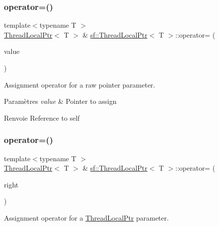 \subsubsection{\texorpdfstring{operator=()}{operator=()}\hspace{0.1cm}{\footnotesize\ttfamily [1/2]}}
{\footnotesize\ttfamily template$<$typename T $>$ \\
\hyperlink{classsf_1_1ThreadLocalPtr}{Thread\+Local\+Ptr}$<$ T $>$ \& \hyperlink{classsf_1_1ThreadLocalPtr}{sf\+::\+Thread\+Local\+Ptr}$<$ T $>$\+::operator= (\begin{DoxyParamCaption}\item[{T $\ast$}]{value }\end{DoxyParamCaption})}



Assignment operator for a raw pointer parameter. 


\begin{DoxyParams}{Paramètres}
{\em value} & Pointer to assign\\
\hline
\end{DoxyParams}
\begin{DoxyReturn}{Renvoie}
Reference to self 
\end{DoxyReturn}
\mbox{\label{classsf_1_1ThreadLocalPtr_a6792a6a808af06f0d13e3ceecf2fc947}} 
\subsubsection{\texorpdfstring{operator=()}{operator=()}\hspace{0.1cm}{\footnotesize\ttfamily [2/2]}}
{\footnotesize\ttfamily template$<$typename T $>$ \\
\hyperlink{classsf_1_1ThreadLocalPtr}{Thread\+Local\+Ptr}$<$ T $>$ \& \hyperlink{classsf_1_1ThreadLocalPtr}{sf\+::\+Thread\+Local\+Ptr}$<$ T $>$\+::operator= (\begin{DoxyParamCaption}\item[{const \hyperlink{classsf_1_1ThreadLocalPtr}{Thread\+Local\+Ptr}$<$ T $>$ \&}]{right }\end{DoxyParamCaption})}



Assignment operator for a \hyperlink{classsf_1_1ThreadLocalPtr}{Thread\+Local\+Ptr} parameter. 


